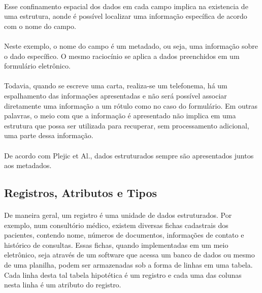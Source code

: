 \paragraph{} Esse confinamento espacial dos dados em cada campo implica na existencia de uma estrutura, aonde é possível localizar uma informação específica de acordo com o nome do campo.

\paragraph{} Neste exemplo, o nome do campo é um metadado, ou seja, uma informação sobre o dado específico. O mesmo raciocínio se aplica a dados preenchidos em um formulário eletrônico.

\paragraph{} Todavia, quando se escreve uma carta, realiza-se um telefonema, há um espalhamento das informações apresentadas e não será possível associar diretamente uma informação a um rótulo como no caso do formulário. Em outras palavras, o meio com que a informação é apresentado não implica em uma estrutura que possa ser utilizada para recuperar, sem processamento adicional, uma parte dessa informação.

\paragraph{} De acordo com Plejic et Al., dados estruturados sempre são apresentados juntos aos metadados\cite{plejic2008}.

\subsection{Registros, Atributos e Tipos}

\paragraph{} De maneira geral, um registro é uma unidade de dados estruturados. Por exemplo, num consultório médico, existem
diversas fichas cadastrais dos pacientes, contendo nome, números de documentos, informações de contato e histórico de consultas. Essas fichas, quando implementadas em um meio eletrônico, seja através de um software que acessa um banco de dados ou mesmo de uma planilha, podem ser armazenadas sob a forma de linhas em uma tabela. Cada linha desta tal tabela hipotética é um registro e cada uma das colunas nesta linha é um atributo do registro.


